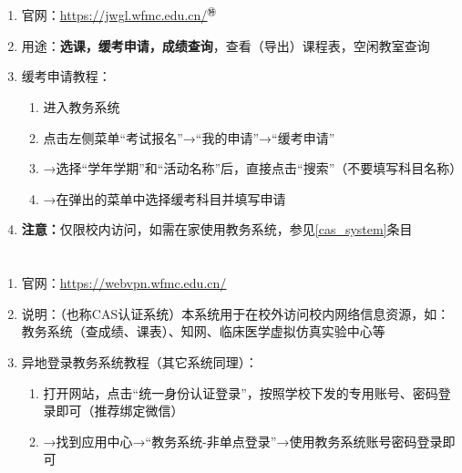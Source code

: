 \section[教务系统]{\textbf{}}
\begin{enumerate}
      \item 官网：\uline{\href{https://jwgl.wfmc.edu.cn/}{https://jwgl.wfmc.edu.cn/}$^㊕$}
      \item 用途：\textbf{选课，缓考申请，成绩查询}，查看（导出）课程表，空闲教室查询
      \item 缓考申请教程：
            \begin{enumerate}
                  \item 进入教务系统
                  \item 点击左侧菜单“考试报名”→“我的申请”→“缓考申请”
                  \item →选择“学年学期”和“活动名称”后，直接点击“搜索”（不要填写科目名称）
                  \item →在弹出的菜单中选择缓考科目并填写申请\footnotemark
            \end{enumerate}
      \item \textbf{注意：}仅限校内访问，如需在家使用教务系统，参见\uline{\ref{cas_system}}条目
\end{enumerate}

\section[资源访问控制系统（校内VPN）]{\textbf{}\footnotemark}
\label{cas_system}
\begin{enumerate}
      \item 官网：\uline{\href{https://webvpn.wfmc.edu.cn/}{https://webvpn.wfmc.edu.cn/}}
      \item 说明：（也称CAS认证系统）本系统用于在校外访问校内网络信息资源，如：教务系统（查成绩、课表）、知网、临床医学虚拟仿真实验中心\footnotemark 等
      \item 异地登录教务系统教程（其它系统同理）：
            \begin{enumerate}
                  \item 打开网站，点击“统一身份认证登录”，按照学校下发的专用账号、密码登录即可（推荐绑定微信）
                  \item →找到应用中心→“教务系统-非单点登录”\footnotemark →使用教务系统账号密码登录即可
            \end{enumerate}
\end{enumerate}

